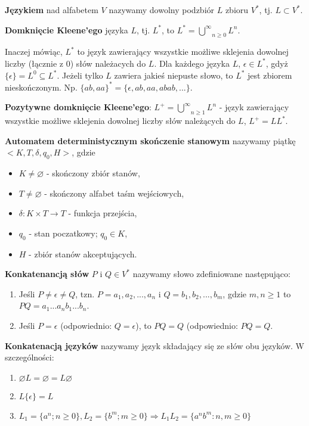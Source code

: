 \documentclass{mwart}
\begin{document}
\textbf{Językiem} nad alfabetem $V$ nazywamy dowolny podzbiór $L$ zbioru $V^{*}$, tj. $L \subset V^{*}$.\medskip

\textbf{Domknięcie Kleene'ego} języka $L$, tj. $L^{*}$, to $L^{*} =\overset{\infty}{\bigcup}_{n \ge 0}L^{n}$.\par
Inaczej mówiąc, $L^{*}$ to język zawierający wszystkie możliwe sklejenia dowolnej liczby (łącznie z 0) słów należacych do $L$.  Dla każdego języka $L$, $\epsilon \in L^{*}$, gdyż $\{\epsilon\} = L^{0} \subseteq L^{*}$.  Jeżeli tylko $L$ zawiera jakieś niepuste słowo, to $L^{*}$ jest zbiorem nieskończonym.  Np. $\{ab, aa\}^{*} = \{\epsilon, ab, aa, abab, ...\}$.\medskip

\textbf{Pozytywne domknięcie Kleene'ego}: $L^{+} =\overset{\infty}{\bigcup}_{n \ge 1}L^{n}$ - język zawierający wszystkie możliwe sklejenia dowolnej liczby słów należących do $L$, $L^{+} = LL^{*}$.\medskip

\textbf{Automatem deterministycznym skończenie stanowym} nazywamy piątkę $<K, T, \delta, q_{0}, H>$, gdzie
\begin{itemize}
\item $K \neq \varnothing$ - skończony zbiór stanów,
\item $T \neq \varnothing$ - skończony alfabet taśm wejściowych,
\item $\delta: K \times T \to T$ - funkcja przejścia,
\item $q_{0}$ - stan poczatkowy; $q_{0} \in K$,
\item $H$ - zbiór stanów akceptujących.
\end{itemize}\medskip

\textbf{Konkatenancją słów} $P$ i $Q \in V^{*}$ nazywamy słowo zdefiniowane następująco:
\begin{enumerate}
\item Jeśli $P \neq \epsilon \neq Q$, tzn. $P = a_{1}, a_{2}, ..., a_{n}$ i $Q = b_{1}, b_{2}, ..., b_{m}$, gdzie $m, n \ge 1$ to $PQ = a_{1}...a_{n}b_{1}...b_{n}$.
\item Jeśli $P = \epsilon$ (odpowiednio: $Q = \epsilon$), to $PQ = Q$ (odpowiednio: $PQ = Q$.
\end{enumerate}\medskip

\textbf{Konkatenacją języków} nazywamy język składający się ze słów obu języków. W szczególności:
\begin{enumerate}
\item $\varnothing L = \varnothing = L\varnothing$
\item $L\{\epsilon\} = L$
\item $L_{1} = \{a^{n}; n \ge 0\}, L_{2} = \{b^{m}; m \ge 0\} \Rightarrow L_{1}L_{2} = \{a^{n}b^{m}: n, m \ge 0 \}$
\end{enumerate}\medskip
\end{document}
